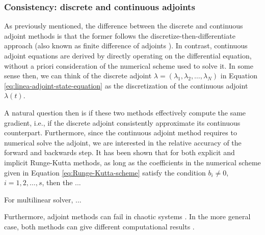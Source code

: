 \subsubsection{Consistency: discrete and continuous adjoints}

As previously mentioned, the difference between the discrete and continuous adjoint methods is that the former follows the discretize-then-differentiate approach (also known as finite difference of adjoints \cite{Sirkes_Tziperman_1997}).
In contrast, continuous adjoint equations are derived by directly operating on the differential equation, without a priori consideration of the numerical scheme used to solve it. 
In some sense then, we can think of the discrete adjoint $\lambda = (\lambda_1, \lambda_2, \ldots, \lambda_N)$ in Equation \eqref{eq:linea-adjoint-state-equation} as the discretization of the continuous adjoint $\lambda(t)$. 

A natural question then is if these two methods effectively compute the same gradient, i.e., if the discrete adjoint consistently approximate its continuous counterpart. 
Furthermore, since the continuous adjoint method requires to numerical solve the adjoint, we are interested in the relative accuracy of the forward and backwards step. 
It has been shown that for both explicit and implicit Runge-Kutta methods, as long as the coefficients in the numerical scheme given in Equation \eqref{eq:Runge-Kutta-scheme} satisfy the condition $b_i \neq 0$, $i=1,2, \ldots, s$, then the ... \cite{Hager_2000,Walther_2007, sandu2006properties, sandu2011solution}

For multilinear solver, ... 


Furthermore, adjoint methods can fail in chaotic systems \cite{Wang2012-chaos-adjoint}.
In the more general case, both methods can give different computational results \cite{Sirkes_Tziperman_1997}.
